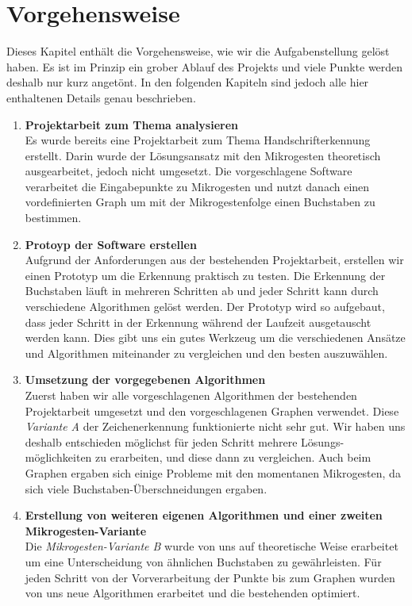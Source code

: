 \chapter{Vorgehensweise}
Dieses Kapitel enthält die Vorgehensweise, wie wir die Aufgabenstellung gelöst haben. Es ist im Prinzip ein grober Ablauf des Projekts und viele Punkte werden deshalb nur kurz angetönt. In den folgenden Kapiteln sind jedoch alle hier enthaltenen Details genau beschrieben.

\begin{enumerate}
\item \textbf{Projektarbeit zum Thema analysieren} \\ 
Es wurde bereits eine Projektarbeit \cite{zeichenerkennung_pa} zum Thema Handschrifterkennung erstellt. Darin wurde der Lösungsansatz mit den Mikrogesten theoretisch ausgearbeitet, jedoch nicht umgesetzt. Die vorgeschlagene Software verarbeitet die Eingabepunkte zu Mikrogesten und nutzt danach einen vordefinierten Graph um mit der Mikrogestenfolge einen Buchstaben zu bestimmen.

\item \textbf{Protoyp der Software erstellen} \\
Aufgrund der Anforderungen aus der bestehenden Projektarbeit, erstellen wir einen Prototyp um die Erkennung praktisch zu testen. Die Erkennung der Buchstaben läuft in mehreren Schritten ab und jeder Schritt kann durch verschiedene Algorithmen gelöst werden. Der Prototyp wird so aufgebaut, dass jeder Schritt in der Erkennung während der Laufzeit ausgetauscht werden kann. Dies gibt uns ein gutes Werkzeug um die verschiedenen Ansätze und Algorithmen miteinander zu vergleichen und den besten auszuwählen.

\item \textbf{Umsetzung der vorgegebenen Algorithmen} \\
Zuerst haben wir alle vorgeschlagenen Algorithmen der bestehenden Projektarbeit umgesetzt und den vorgeschlagenen Graphen verwendet. Diese \emph{Variante A} der Zeichenerkennung funktionierte nicht sehr gut. Wir haben uns deshalb entschieden möglichst für jeden Schritt mehrere Lösungs-möglichkeiten zu erarbeiten, und diese dann zu vergleichen. Auch beim Graphen ergaben sich einige Probleme mit den momentanen Mikrogesten, da sich viele Buchstaben-Überschneidungen ergaben.

\item \textbf{Erstellung von weiteren eigenen Algorithmen und einer zweiten Mikrogesten-Variante} \\
Die \emph{Mikrogesten-Variante B} wurde von uns auf theoretische Weise erarbeitet um eine Unterscheidung von ähnlichen Buchstaben zu gewährleisten. Für jeden Schritt von der Vorverarbeitung der Punkte bis zum Graphen wurden von uns neue Algorithmen erarbeitet und die bestehenden optimiert. 


\end{enumerate}
